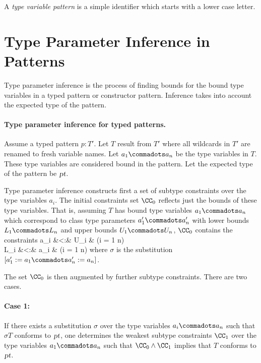 A {\em type variable pattern} is a simple identifier which starts with
a lower case letter.

\section{Type Parameter Inference in Patterns}\label{sec:type-param-inf-pat}

Type parameter inference is the process of finding bounds for the
bound type variables in a typed pattern or constructor
pattern. Inference takes into account the expected type of the
pattern.

\paragraph{Type parameter inference for typed patterns.}
Assume a typed pattern $p: T'$. Let $T$ result from $T'$ where all wildcards in
$T'$ are renamed to fresh variable names.  Let $a_1 \commadots a_n$ be
the type variables in $T$. These type variables are considered bound
in the pattern. Let the expected type of the pattern be $\mbox{\sl pt}$.

Type parameter inference constructs first a set of subtype constraints over
the type variables $a_i$. The initial constraints set $\CC_0$ reflects
just the bounds of these type variables. That is, assuming $T$ has
bound type variables $a_1 \commadots a_n$ which correspond to class
type parameters $a'_1 \commadots a'_n$ with lower bounds $L_1
\commadots L_n$ and upper bounds $U_1 \commadots U_n$, $\CC_0$
contains the constraints  a_i &<:& \sigma U_i & \gap (i = 1
\commadots n)\\ \sigma L_i &<:& a_i & \gap (i = 1 \commadots n) \eda
where $\sigma$ is the substitution $[a'_1 := a_1 \commadots a'_n :=
a_n]$.

The set $\CC_0$ is then augmented by further subtype constraints. There are two
cases.

\paragraph{Case 1:}
If there exists a substitution $\sigma$ over the type variables $a_i
\commadots a_n$ such that $\sigma T$ conforms to $\mbox{\sl pt}$, one determines
the weakest subtype constraints $\CC_1$ over the type variables $a_1
\commadots a_n$ such that $\CC_0 \wedge \CC_1$ implies that $T$
conforms to $\mbox{\sl pt}$.

